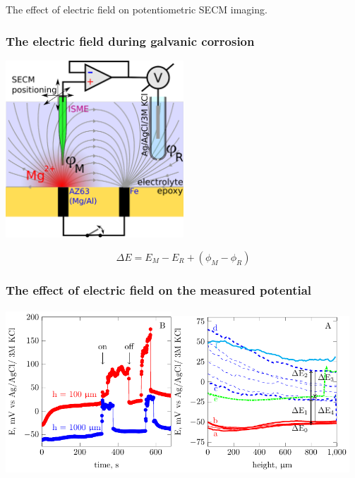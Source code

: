 \documentclass{beamer}
\begin{document}
\begin{frame}[plain]
\centering
The effect of electric field on potentiometric SECM imaging.
\end{frame}

\begin{frame}
\begin{center}
\frametitle{The electric field during galvanic corrosion}
\includegraphics[width=0.5\textwidth]{field.eps}

\begin{equation*}
\Delta E=E_M-E_R + (\phi_M - \phi_R)
\label{eq:potential}
\end{equation*}
\end{center}
\end{frame}

\begin{frame}
\frametitle{The effect of electric field on the measured potential}
\framesubtitle{}
\centering
\includegraphics[width=0.466\textwidth]{field-figure1.pdf}\includegraphics[width=0.5\textwidth]{field-figure0.pdf}
\end{frame}
\end{document}
